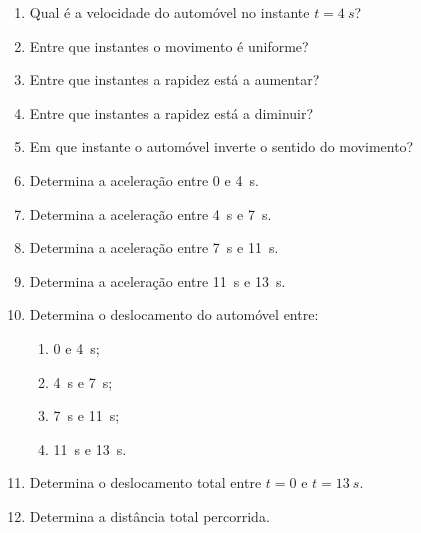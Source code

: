 \documentclass[11pt,a4paper]{article}
\newcommand{\resposta}[1][0.8]{
	\vspace{#1cm}
}
\begin{document}
	\begin{enumerate}[label=\textbf{\arabic*.},resume]
		
		\item Qual é a velocidade do automóvel no instante $t=\SI{4}{s}$?
		
		\resposta[0.5]
		
		\item Entre que instantes o movimento é uniforme?
		
		\resposta[0.7]
		
		\item Entre que instantes a rapidez está a aumentar?
		
		\resposta[0.8]
		
		\item Entre que instantes a rapidez está a diminuir?
		
		\resposta[0.8]
		
		\item Em que instante o automóvel inverte o sentido do movimento?
		
		\resposta[0.7]
		
		\item Determina a aceleração entre $0$ e \SI{4}{s}.
		
		\resposta[1.1]
		
		\item Determina a aceleração entre \SI{4}{s} e \SI{7}{s}.
		
		\resposta[0.9]
		
		\item Determina a aceleração entre \SI{7}{s} e \SI{11}{s}.
		
		\resposta[1.1]
		
		\item Determina a aceleração entre \SI{11}{s} e \SI{13}{s}.
		
		\resposta[1.0]
		
		\item Determina o deslocamento do automóvel entre:
		
		\begin{enumerate}[label=\alph*)]
			
			\item $0$ e \SI{4}{s};
			
			\item \SI{4}{s} e \SI{7}{s};
			
			\item \SI{7}{s} e \SI{11}{s};
			
			\item \SI{11}{s} e \SI{13}{s}.
			
		\end{enumerate}
		
		\resposta[2.0]
		
		\item Determina o deslocamento total entre $t=0$ e $t=\SI{13}{s}$.
		
		\resposta[1.0]
		
		\item Determina a distância total percorrida.
		
		\resposta[1.0]
		
	\end{enumerate}
	
\end{document}
